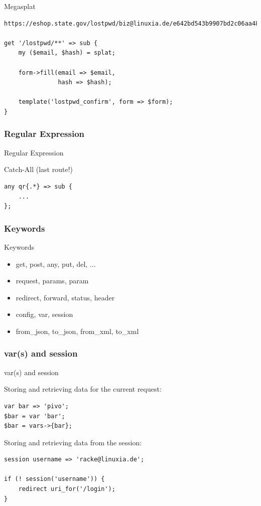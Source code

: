 \begin{frame}[fragile]{Megasplat}
\begin{lstlisting}
https://eshop.state.gov/lostpwd/biz@linuxia.de/e642bd543b9907bd2c06aa485261cb1a849a9f23fc7324bff45ebd35f4efe2cb

get '/lostpwd/**' => sub {
    my ($email, $hash) = splat;

    form->fill(email => $email,
               hash => $hash);
    
    template('lostpwd_confirm', form => $form);
}
\end{lstlisting}
\end{frame}

\subsubsection{Regular Expression}

\begin{frame}[fragile]{Regular Expression}

Catch-All (last route!)

\begin{lstlisting}
any qr{.*} => sub {
    ...
};
\end{lstlisting}
\end{frame}

\subsubsection{Keywords}
\begin{frame}[fragile]{Keywords}
\begin{itemize}
\item get, post, any, put, del, ...
\item request, params, param
\item redirect, forward, status, header
\item config, var, session
\item from\_json, to\_json, from\_xml, to\_xml
\end{itemize}
\end{frame}

\subsubsection{var(s) and session}
\begin{frame}[fragile]{var(s) and session}

Storing and retrieving data for the current request:

\begin{lstlisting}
var bar => 'pivo';
$bar = var 'bar';
$bar = vars->{bar};
\end{lstlisting}

Storing and retrieving data from the session:

\begin{lstlisting}
session username => 'racke@linuxia.de';

if (! session('username')) {
    redirect uri_for('/login');
}
\end{lstlisting}

\end{frame}

